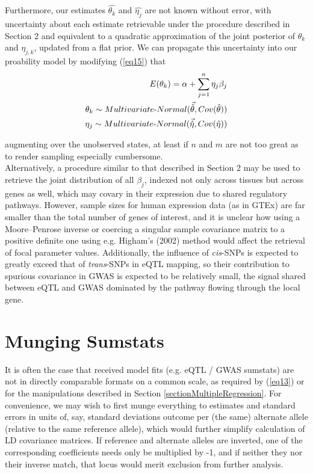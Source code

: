 \documentclass[12pt]{article}
\begin{document}
Furthermore, our estimates $\hat{\theta_k}$ and $\hat{\eta_j}$ are not known without error, with uncertainty about each estimate retrievable under the procedure described in Section 2 and equivalent to a quadratic approximation of the joint posterior of $\theta_k$ and $\eta_{j,k}$, updated from a flat prior. We can propagate this uncertainty into our proability model by modifying (\ref{eq15}) that
\begin{align}
E(\theta_{k}) = \alpha + \sum_{j=1}^{n}\eta_j\beta_j \label{eq42}\\
\theta_{k} \sim Multivariate{\text -}Normal(\vec{\hat{\theta}}, Cov({\hat{\theta}})) \label{eq43}\\
\eta_{j} \sim Multivariate{\text -}Normal(\vec{\hat{\eta}},Cov(\hat{\eta})) \label{eq44}
\end{align}

augmenting over the unobserved states, at least if $n$ and $m$ are not too great as to render sampling especially cumbersome.\\

Alternatively, a procedure similar to that described in Section 2 may be used to retrieve the joint distribution of all $\beta_j$, indexed not only across tissues but across genes as well, which may covary in their expression due to shared regulatory pathways. However, sample sizes for human expression data (as in GTEx) are far smaller than the total number of genes of interest, and it is unclear how using a Moore–Penrose inverse or coercing a singular sample covariance matrix to a positive definite one using e.g. Higham's (2002) method would affect the retrieval of focal parameter values. Additionally, the influence of \textit{cis}-SNPs is expected to greatly exceed that of \textit{trans}-SNPs in eQTL mapping, so their contribution to spurious covariance in GWAS is expected to be relatively small, the signal shared between eQTL and GWAS dominated by the pathway flowing through the local gene.

\section{Munging Sumstats}\label{sectionMunge}

It is often the case that received model fits (e.g. eQTL / GWAS sumstats) are not in directly comparable formats on a common scale, as required by (\ref{eq13}) or for the manipulations described in Section \ref{sectionMultipleRegression}. For convenience, we may wish to first munge everything to estimates and standard errors in units of, say, standard deviations outcome per (the same) alternate allele (relative to the same reference allele), which would further simplify calculation of LD covariance matrices. If reference and alternate alleles are inverted, one of the corresponding coefficients needs only be multiplied by -1, and if neither they nor their inverse match, that locus would merit exclusion from further analysis.
\end{document}

